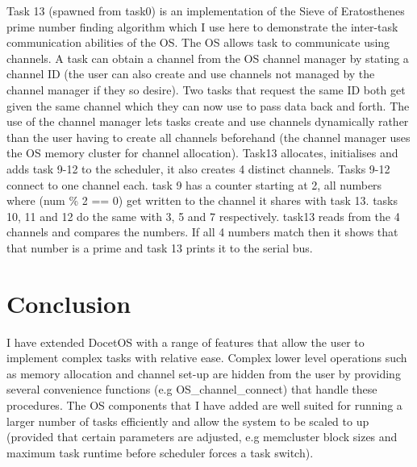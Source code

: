 \documentclass[12pt,a4paper]{article}
\begin{document}
Task 13 (spawned from task0) is an implementation of the Sieve of Eratosthenes prime number finding algorithm which I use here to demonstrate the inter-task communication abilities of the OS. The OS allows task to communicate using channels. A task can obtain a channel from the OS channel manager by stating a channel ID (the user can also create and use channels not managed by the channel manager if they so desire). Two tasks that request the same ID both get given the same channel which they can now use to pass data back and forth. The use of the channel manager lets tasks create and use channels dynamically rather than the user having to create all channels beforehand (the channel manager uses the OS memory cluster for channel allocation). Task13 allocates, initialises and adds task 9-12 to the scheduler, it also creates 4 distinct channels. Tasks 9-12 connect to one channel each. task 9 has a counter starting at 2, all numbers where (num \% 2 == 0) get written to the channel it shares with task 13. tasks 10, 11 and 12 do the same with 3, 5 and 7 respectively. task13 reads from the 4 channels and compares the numbers. If all 4 numbers match then it shows that that number is a prime and task 13 prints it to the serial bus.

\section{Conclusion}
I have extended DocetOS with a range of features that allow the user to implement complex tasks with relative ease. Complex lower level operations such as memory allocation and channel set-up are hidden from the user by providing several convenience functions (e.g OS\_channel\_connect) that handle these procedures. The OS components that I have added are well suited for running a larger number of tasks efficiently and allow the system to be scaled to up (provided that certain parameters are adjusted, e.g memcluster block sizes and maximum task runtime before scheduler forces a task switch).
\end{document}
